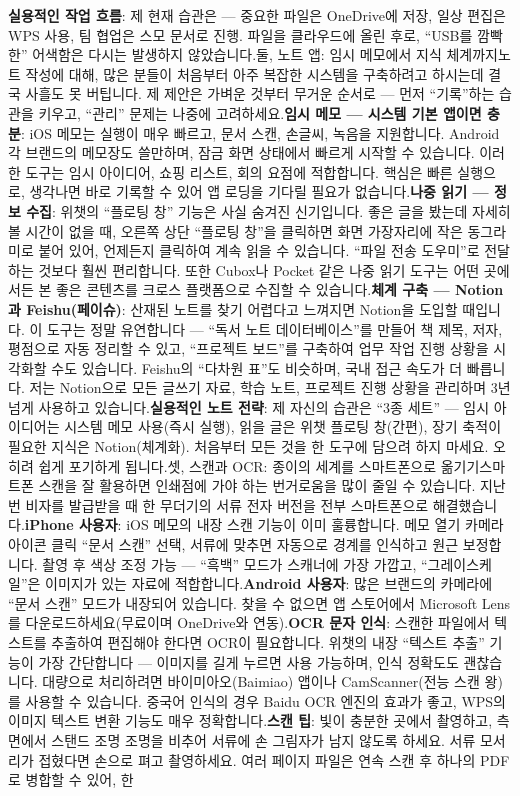 \textbf{실용적인 작업 흐름}: 제 현재 습관은 — 중요한 파일은 OneDrive에 저장, 일상 편집은 WPS 사용, 팀 협업은 스모 문서로 진행. 파일을 클라우드에 올린 후로, “USB를 깜빡한” 어색함은 다시는 발생하지 않았습니다.둘, 노트 앱: 임시 메모에서 지식 체계까지노트 작성에 대해, 많은 분들이 처음부터 아주 복잡한 시스템을 구축하려고 하시는데 결국 사흘도 못 버팁니다. 제 제안은 가벼운 것부터 무거운 순서로 — 먼저 “기록”하는 습관을 키우고, “관리” 문제는 나중에 고려하세요.\textbf{임시 메모 — 시스템 기본 앱이면 충분}: iOS 메모는 실행이 매우 빠르고, 문서 스캔, 손글씨, 녹음을 지원합니다. Android 각 브랜드의 메모장도 쓸만하며, 잠금 화면 상태에서 빠르게 시작할 수 있습니다. 이러한 도구는 임시 아이디어, 쇼핑 리스트, 회의 요점에 적합합니다. 핵심은 빠른 실행으로, 생각나면 바로 기록할 수 있어 앱 로딩을 기다릴 필요가 없습니다.\textbf{나중 읽기 — 정보 수집}: 위챗의 “플로팅 창” 기능은 사실 숨겨진 신기입니다. 좋은 글을 봤는데 자세히 볼 시간이 없을 때, 오른쪽 상단 “플로팅 창”을 클릭하면 화면 가장자리에 작은 동그라미로 붙어 있어, 언제든지 클릭하여 계속 읽을 수 있습니다. “파일 전송 도우미”로 전달하는 것보다 훨씬 편리합니다. 또한 Cubox나 Pocket 같은 나중 읽기 도구는 어떤 곳에서든 본 좋은 콘텐츠를 크로스 플랫폼으로 수집할 수 있습니다.\textbf{체계 구축 — Notion과 Feishu(페이슈)}: 산재된 노트를 찾기 어렵다고 느껴지면 Notion을 도입할 때입니다. 이 도구는 정말 유연합니다 — “독서 노트 데이터베이스”를 만들어 책 제목, 저자, 평점으로 자동 정리할 수 있고, “프로젝트 보드”를 구축하여 업무 작업 진행 상황을 시각화할 수도 있습니다. Feishu의 “다차원 표”도 비슷하며, 국내 접근 속도가 더 빠릅니다. 저는 Notion으로 모든 글쓰기 자료, 학습 노트, 프로젝트 진행 상황을 관리하며 3년 넘게 사용하고 있습니다.\textbf{실용적인 노트 전략}: 제 자신의 습관은 “3종 세트” — 임시 아이디어는 시스템 메모 사용(즉시 실행), 읽을 글은 위챗 플로팅 창(간편), 장기 축적이 필요한 지식은 Notion(체계화). 처음부터 모든 것을 한 도구에 담으려 하지 마세요. 오히려 쉽게 포기하게 됩니다.셋, 스캔과 OCR: 종이의 세계를 스마트폰으로 옮기기스마트폰 스캔을 잘 활용하면 인쇄점에 가야 하는 번거로움을 많이 줄일 수 있습니다. 지난번 비자를 발급받을 때 한 무더기의 서류 전자 버전을 전부 스마트폰으로 해결했습니다.\textbf{iPhone 사용자}: iOS 메모의 내장 스캔 기능이 이미 훌륭합니다. 메모 열기 카메라 아이콘 클릭 “문서 스캔” 선택, 서류에 맞추면 자동으로 경계를 인식하고 원근 보정합니다. 촬영 후 색상 조정 가능 — “흑백” 모드가 스캐너에 가장 가깝고, “그레이스케일”은 이미지가 있는 자료에 적합합니다.\textbf{Android 사용자}: 많은 브랜드의 카메라에 “문서 스캔” 모드가 내장되어 있습니다. 찾을 수 없으면 앱 스토어에서 Microsoft Lens를 다운로드하세요(무료이며 OneDrive와 연동).\textbf{OCR 문자 인식}: 스캔한 파일에서 텍스트를 추출하여 편집해야 한다면 OCR이 필요합니다. 위챗의 내장 “텍스트 추출” 기능이 가장 간단합니다 — 이미지를 길게 누르면 사용 가능하며, 인식 정확도도 괜찮습니다. 대량으로 처리하려면 바이미아오(Baimiao) 앱이나 CamScanner(전능 스캔 왕)를 사용할 수 있습니다. 중국어 인식의 경우 Baidu OCR 엔진의 효과가 좋고, WPS의 이미지 텍스트 변환 기능도 매우 정확합니다.\textbf{스캔 팁}: 빛이 충분한 곳에서 촬영하고, 측면에서 스탠드 조명 조명을 비추어 서류에 손 그림자가 남지 않도록 하세요. 서류 모서리가 접혔다면 손으로 펴고 촬영하세요. 여러 페이지 파일은 연속 스캔 후 하나의 PDF로 병합할 수 있어, 한 